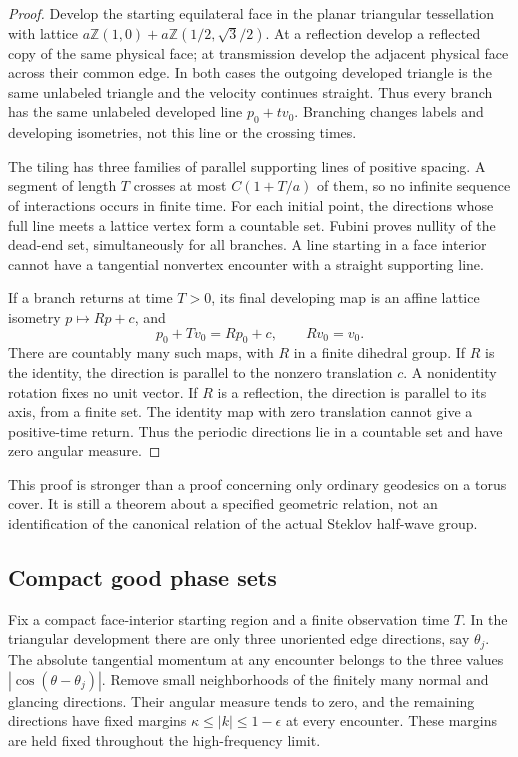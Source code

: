 \documentclass[11pt]{amsart}
\numberwithin{equation}{section}
\theoremstyle{remark}
\begin{document}
\begin{proof}
Develop the starting equilateral face in the planar triangular tessellation with lattice $a\mathbb Z(1,0)+a\mathbb Z(1/2,\sqrt3/2)$. At a reflection develop a reflected copy of the same physical face; at transmission develop the adjacent physical face across their common edge. In both cases the outgoing developed triangle is the same unlabeled triangle and the velocity continues straight. Thus every branch has the same unlabeled developed line $p_0+tv_0$. Branching changes labels and developing isometries, not this line or the crossing times.

The tiling has three families of parallel supporting lines of positive spacing. A segment of length $T$ crosses at most $C(1+T/a)$ of them, so no infinite sequence of interactions occurs in finite time. For each initial point, the directions whose full line meets a lattice vertex form a countable set. Fubini proves nullity of the dead-end set, simultaneously for all branches. A line starting in a face interior cannot have a tangential nonvertex encounter with a straight supporting line.

If a branch returns at time $T>0$, its final developing map is an affine lattice isometry $p\mapsto Rp+c$, and
\begin{equation}\label{eq:return}
p_0+Tv_0=Rp_0+c,\qquad Rv_0=v_0 .
\end{equation}
There are countably many such maps, with $R$ in a finite dihedral group. If $R$ is the identity, the direction is parallel to the nonzero translation $c$. A nonidentity rotation fixes no unit vector. If $R$ is a reflection, the direction is parallel to its axis, from a finite set. The identity map with zero translation cannot give a positive-time return. Thus the periodic directions lie in a countable set and have zero angular measure.
\end{proof}

This proof is stronger than a proof concerning only ordinary geodesics on a torus cover. It is still a theorem about a specified geometric relation, not an identification of the canonical relation of the actual Steklov half-wave group.

\subsection{Compact good phase sets}
Fix a compact face-interior starting region and a finite observation time $T$. In the triangular development there are only three unoriented edge directions, say $\theta_j$. The absolute tangential momentum at any encounter belongs to the three values $|\cos(\theta-\theta_j)|$. Remove small neighborhoods of the finitely many normal and glancing directions. Their angular measure tends to zero, and the remaining directions have fixed margins $\kappa\le|k|\le1-\epsilon$ at every encounter. These margins are held fixed throughout the high-frequency limit.
\end{document}
